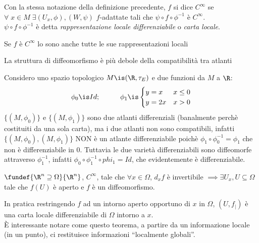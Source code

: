 \begin{defn}[$C^\infty$]
Con la stessa notazione della definizione precedente, $f$ si dice \emph{$C^\infty$} se
$\forall \; x \in M \;  \exists (U_x,\phi), (W,\psi)$ $f$-adattate tali che $\psi \circ f \circ \phi^{-1}$ è $C^\infty$.\\ 
$\psi \circ f \circ \phi^{-1}$ è detta \emph{rappresentazione locale differenziabile} o \emph{carta locale}.
\end{defn}

\begin{prop}
Se $f$ è $C^\infty$ lo sono anche tutte le sue rappresentazioni locali
\end{prop}

\begin{oss}
La struttura di diffeomorfismo è più debole della compatibilità tra atlanti
\end{oss}

\begin{es}
Considero uno spazio topologico $M \is (\R,\tau_E)$ e due funzioni da $M$ a $\R$:
\begin{equation*}
\phi_0\is Id ;\hspace{1cm} \phi_1\is\begin{cases}y=x & x\le 0 \\ y=2x & x>0 \end{cases}
\end{equation*}
$\{(M,\phi_0)\}$ e $\{(M,\phi_1)\}$ sono due atlanti differenziali (banalmente perchè costituiti da una sola carta), ma i due atlanti non sono compatibili, infatti $\{(M,\phi_0),(M,\phi_1)\}$ NON è un atlante differenziabile poichè $\phi_1 \circ \phi_0^{-1} = \phi_1$ che non è differenziabile in 0.
Tuttavia le due varietà differenziabili sono diffeomorfe attraverso $\phi_1^{-1}$, infatti $\phi_0 \circ \phi_1^{-1} \circ phi_1 = Id$, che evidentemente è differenziabile.
\end{es}

\begin{oss}
\end{oss}

\begin{teo}
$\fundef{\R^n \supseteq \Omega}{\R^n}$, $C^\infty$, tale che $\forall x \in \Omega$, $d_xf$ è invertibile $\implies \exists U_x, U\subseteq \Omega$ tale che $f(U)$ è aperto e $f$ è un diffeomorfismo.
\end{teo}

\begin{oss}
In pratica restringendo $f$ ad un intorno aperto opportuno di $x$ in $\Omega$, $(U,f_|)$ è una carta locale differenziabile di $\Omega$ intorno a $x$.\\
È interessante notare come questo teorema, a partire da un informazione locale (in un punto), ci restituisce informazioni ``localmente globali''.
\end{oss}

